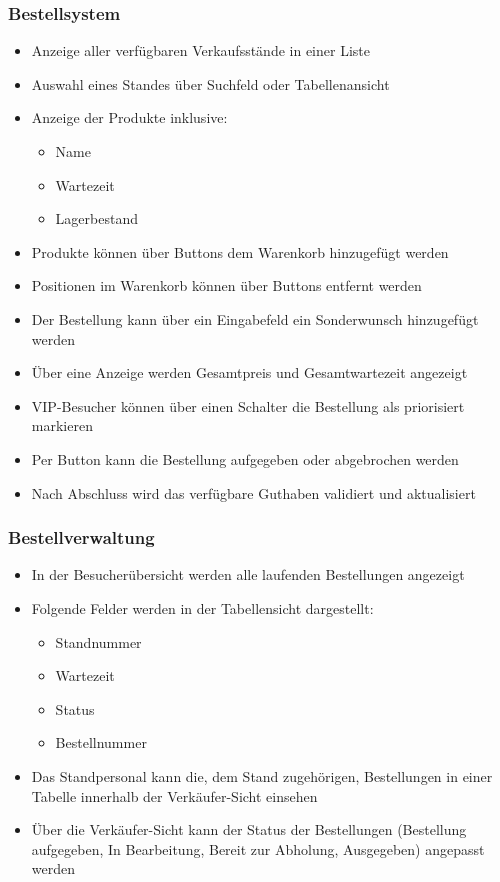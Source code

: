 \subsubsection*{Bestellsystem}
\begin{itemize}
    \item Anzeige aller verfügbaren Verkaufsstände in einer Liste
    \item Auswahl eines Standes über Suchfeld oder Tabellenansicht
    \item Anzeige der Produkte inklusive:
    \begin{itemize}
        \item Name
        \item Wartezeit
        \item Lagerbestand
    \end{itemize}
    \item Produkte können über Buttons dem Warenkorb hinzugefügt werden
    \item Positionen im Warenkorb können über Buttons entfernt werden
    \item Der Bestellung kann über ein Eingabefeld ein Sonderwunsch hinzugefügt werden
    \item Über eine Anzeige werden Gesamtpreis und Gesamtwartezeit angezeigt
    \item \acs{VIP}-Besucher können über einen Schalter die Bestellung als priorisiert markieren
    \item Per Button kann die Bestellung aufgegeben oder abgebrochen werden
    \item Nach Abschluss wird das verfügbare Guthaben validiert und aktualisiert
\end{itemize}

\subsubsection*{Bestellverwaltung}
\begin{itemize}
    \item In der Besucherübersicht werden alle laufenden Bestellungen angezeigt
    \item Folgende Felder werden in der Tabellensicht dargestellt:
    \begin{itemize}
        \item Standnummer
        \item Wartezeit
        \item Status
        \item Bestellnummer
    \end{itemize}
    \item Das Standpersonal kann die, dem Stand zugehörigen, Bestellungen in einer Tabelle innerhalb der Verkäufer-Sicht einsehen
    \item Über die Verkäufer-Sicht kann der Status der Bestellungen (Bestellung aufgegeben, In Bearbeitung, Bereit zur Abholung, Ausgegeben) angepasst werden
\end{itemize}

